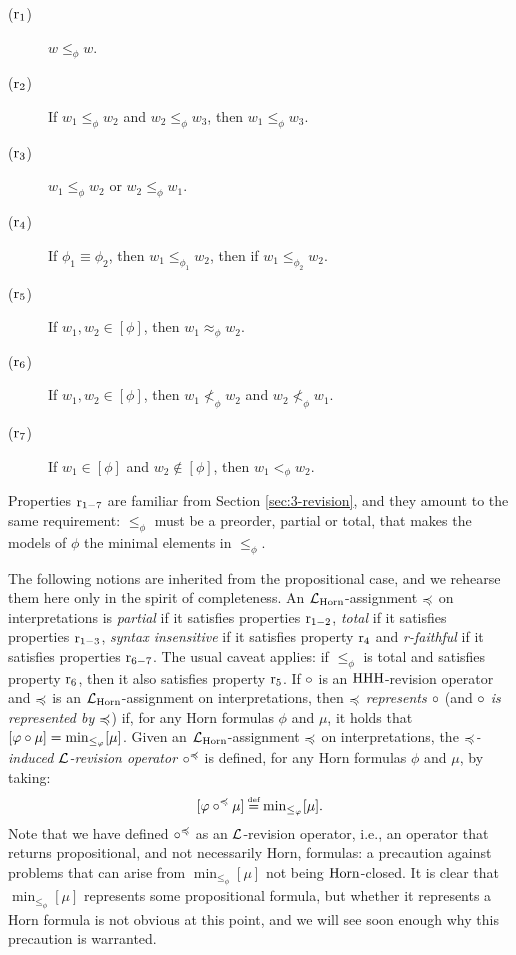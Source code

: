 \begin{description}
	\item[($\mathrm{r}_{1}$)] $w\le_\phi w$.
	\item[($\mathrm{r}_{2}$)] If $w_1\le_\phi w_2$ and $w_2\le_\phi w_3$, then $w_1\le_\phi w_3$.
	\item[($\mathrm{r}_{3}$)] $w_1\le_\phi w_2$ or $w_2\le_\phi w_1$.
	\item[($\mathrm{r}_{4}$)] If $\phi_{1}\equiv \phi_{2}$,
		then $w_1\le_{\phi_{1}} w_2$, then if $w_1\le_{\phi_{2}}w_2$.	
	\item[($\mathrm{r}_{5}$)] If $w_1,w_2\in[\phi]$, then $w_1\approx_\phi w_2$.
	\item[($\mathrm{r}_{6}$)] If $w_1,w_2\in[\phi]$, then $w_1\not<_\phi w_2$ and $w_2\not<_\phi w_1$.
	\item[($\mathrm{r}_{7}$)] If $w_1\in [\phi]$ and $w_2\notin [\phi]$, then $w_1 <_\phi w_2$.
\end{description}

Properties $\mathrm{r}_{1-7}$ are familiar from Section \ref{sec:3-revision},
and they amount to the same requirement: $\le_{\phi}$ must be a preorder,
partial or total, that makes the models of $\phi$ the minimal elements in $\le_{\phi}$.

The following notions are inherited from the propositional case,
and we rehearse them here only in the spirit of completeness.
An $\mathcal{L}_{\mathrm{Horn}}$-assignment $\preccurlyeq$ on interpretations
is \emph{partial} if it satisfies properties $\mathrm{r}_{1-2}$,
\emph{total} if it satisfies properties $\mathrm{r}_{1-3}$,
\emph{syntax insensitive} if it satisfies property $\mathrm{r}_{4}$
and \emph{r-faithful} if it satisfies properties $\mathrm{r}_{6-7}$.
The usual caveat applies: if $\le_{\phi}$ is total and satisfies 
property $\mathrm{r}_{6}$, then it also satisfies property $\mathrm{r}_{5}$.
If $\circ$ is an ${\mathrm{HHH}}$-revision operator and 
$\preccurlyeq$ is an $\mathcal{L}_{\mathrm{Horn}}$-assignment on interpretations,
then \emph{$\preccurlyeq$ represents $\circ$}
(and \emph{$\circ$ is represented by $\preccurlyeq$})
if, for any Horn formulas $\phi$ and $\mu$,
it holds that $[\varphi\circ\mu] = {\operatorname{min}}_{\le_\varphi}[\mu]$. 
Given an $\mathcal{L}_{\mathrm{Horn}}$-assignment $\preccurlyeq$ on interpretations, 
the \emph{$\preccurlyeq$-induced $\mathcal{L}$-revision operator $\circ^\preccurlyeq$} is defined,
for any Horn formulas $\phi$ and $\mu$, 
by taking:
$$
	[\phi\re^\as\mu]\defeq\min_{\le_\phi}[\mu].
$$
Note that we have defined $\circ^{\preccurlyeq}$ as an $\mathcal{L}$-revision operator,
i.e., an operator that returns propositional, and not necessarily Horn, formulas:
a precaution against problems that can arise from 
$\min_{\le_\phi}[\mu]$ not being $\mathrm{Horn}$-closed.
It is clear that $\min_{\le_\phi}[\mu]$ represents some 
propositional formula, but whether it represents a Horn formula 
is not obvious at this point, 
and we will see soon enough why this precaution is warranted.

